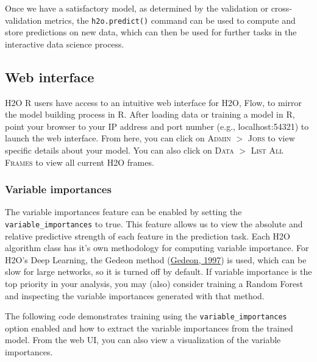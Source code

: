 Once we have a satisfactory model, as determined by the validation or cross-validation metrics, the \texttt{h2o.predict()} command can be used to compute and store predictions on new data, which can then be used for further tasks in the interactive data science process.

\waterExampleInR


\waterExampleInPython




\subsection{Web interface} 

H2O R users have access to an intuitive web interface for H2O, Flow, to mirror the model building process in R. After loading data or training a model in R, point your browser to your IP address and port number (e.g., localhost:54321) to launch the web interface. From here, you can click on \textsc{Admin} $>$ \textsc{Jobs} to view specific details about your model. You can also click on \textsc{Data} $>$ \textsc{List All Frames} to view all current H2O frames. 

\subsubsection{Variable importances} 

The variable importances feature can be enabled by setting the \texttt{variable\_importances} to true. This feature allows us to view the absolute and relative predictive strength of each feature in the prediction task.  Each H2O algorithm class has it's own methodology for computing variable importance.  For H2O's Deep Learning, the Gedeon method (\href{http://cs.anu.edu.au/people/Tom.Gedeon/pdfs/ContribDataMinv2.pdf}{Gedeon, 1997}) is used, which can be slow for large networks, so it is turned off by default.  If variable importance is the top priority in your analysis, you may (also) consider training a Random Forest and inspecting the variable importances generated with that method.

The following code demonstrates training using the \texttt{variable\_importances} option enabled and how to extract the variable importances from the trained model.  From the web UI, you can also view a visualization of the variable importances.

